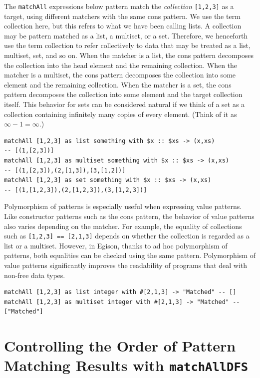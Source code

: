The \lstinline{matchAll} expressions below pattern match the \emph{collection} \lstinline{[1,2,3]} as a target, using different matchers with the same cons pattern.
We use the term collection here, but this refers to what we have been calling lists.
A collection may be pattern matched as a list, a multiset, or a set.
Therefore, we henceforth use the term collection to refer collectively to data that may be treated as a list, multiset, set, and so on.
When the matcher is a list, the cons pattern decomposes the collection into the head element and the remaining collection.
When the matcher is a multiset, the cons pattern decomposes the collection into some element and the remaining collection.
When the matcher is a set, the cons pattern decomposes the collection into some element and the target collection itself.
This behavior for sets can be considered natural if we think of a set as a collection containing infinitely many copies of every element.
(Think of it as $\infty - 1 = \infty$.)
\begin{lstlisting}[language=egison,numbers=none]
matchAll [1,2,3] as list something with $x :: $xs -> (x,xs)
-- [(1,[2,3])]
matchAll [1,2,3] as multiset something with $x :: $xs -> (x,xs)
-- [(1,[2,3]),(2,[1,3]),(3,[1,2])]
matchAll [1,2,3] as set something with $x :: $xs -> (x,xs)
-- [(1,[1,2,3]),(2,[1,2,3]),(3,[1,2,3])]
\end{lstlisting}

Polymorphism of patterns is especially useful when expressing value patterns.
Like constructor patterns such as the cons pattern, the behavior of value patterns also varies depending on the matcher.
For example, the equality of collections such as \lstinline{[1,2,3] == [2,1,3]} depends on whether the collection is regarded as a list or a multiset.
However, in Egison, thanks to ad hoc polymorphism of patterns, both equalities can be checked using the same pattern.
Polymorphism of value patterns significantly improves the readability of programs that deal with non-free data types.
\begin{lstlisting}[language=egison,numbers=none]
matchAll [1,2,3] as list integer with #[2,1,3] -> "Matched" -- []
matchAll [1,2,3] as multiset integer with #[2,1,3] -> "Matched" -- ["Matched"]
\end{lstlisting}

\section{Controlling the Order of Pattern Matching Results with \texttt{matchAllDFS}}\label{quick-matchalldfs}

